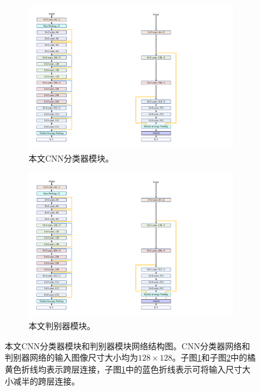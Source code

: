 \begin{figure}[h!]
	\centering
	\begin{subfigure}{0.3\textwidth}
		\centering
		\includegraphics[width=1.0\textwidth]{figure/classifier_architecture.pdf}
		\caption{本文CNN分类器模块。}
		\label{subfig:classifier_architecture}
	\end{subfigure}
	\qquad\qquad\qquad\qquad
	\begin{subfigure}{0.348\textwidth}
		\centering
		\includegraphics[width=1.0\textwidth]{figure/discrimintor_architecture.pdf}
		\caption{本文判别器模块。}
		\label{subfig:discrimintor_architecture}
	\end{subfigure}
	\caption[本文CNN分类器模块和判别器模块网络结构图]{本文CNN分类器模块和判别器模块网络结构图。CNN分类器网络和判别器网络的输入图像尺寸大小均为$128\times 128$。子图\ref{subfig:classifier_architecture}和子图\ref{subfig:discrimintor_architecture}中的橘黄色折线均表示跨层连接，子图\ref{subfig:classifier_architecture}中的蓝色折线表示可将输入尺寸大小减半的跨层连接。}
	\label{mul_fig:classifier_and_discrimintor_architecture}
\end{figure}
